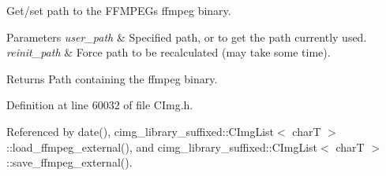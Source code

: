 Get/set path to the F\+F\+M\+P\+EG\textquotesingle{}s {\ttfamily ffmpeg} binary. 


\begin{DoxyParams}{Parameters}
{\em user\+\_\+path} & Specified path, or {} to get the path currently used. \\
\hline
{\em reinit\+\_\+path} & Force path to be recalculated (may take some time). \\
\hline
\end{DoxyParams}
\begin{DoxyReturn}{Returns}
Path containing the {\ttfamily ffmpeg} binary. 
\end{DoxyReturn}


Definition at line 60032 of file C\+Img.\+h.



Referenced by date(), cimg\+\_\+library\+\_\+suffixed\+::\+C\+Img\+List$<$ char\+T $>$\+::load\+\_\+ffmpeg\+\_\+external(), and cimg\+\_\+library\+\_\+suffixed\+::\+C\+Img\+List$<$ char\+T $>$\+::save\+\_\+ffmpeg\+\_\+external().

